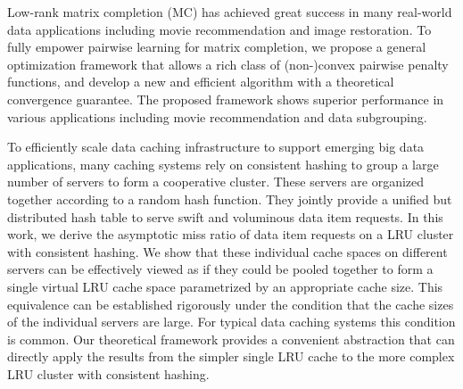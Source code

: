 \documentclass{osudissert96}
\begin{document}


\vspace{0.2cm}
 Low-rank matrix completion (MC) has achieved great success in many real-world data applications including movie recommendation and image restoration.  To fully empower pairwise learning for matrix completion, 
we propose a general optimization framework that allows a rich class of (non-)convex pairwise penalty functions, and develop a new and efficient algorithm with a theoretical convergence guarantee. 
The proposed framework shows superior performance in various applications including movie recommendation and data subgrouping. 

\vspace{0.2cm}
To efficiently scale data caching infrastructure to support emerging big data applications, many caching systems rely on consistent
hashing to group
a large number of servers to form a cooperative cluster.
These servers are organized together according to a random hash function.
They jointly provide a unified but distributed hash table to serve swift and voluminous
data item requests. 
In this work, we derive the asymptotic miss ratio of data item requests on a LRU cluster
with consistent hashing.
We show that these individual cache spaces on different servers  
can be effectively viewed as if
they could be pooled together 
to form a single virtual LRU cache space parametrized by an appropriate cache size.  This equivalence can be established rigorously
under the condition that the cache sizes of
the individual servers are large. For typical data caching systems this condition is common.  
Our theoretical framework provides a convenient abstraction that can directly apply the results from the simpler
single LRU cache to the more complex LRU cluster with consistent hashing.  
\end{document}
